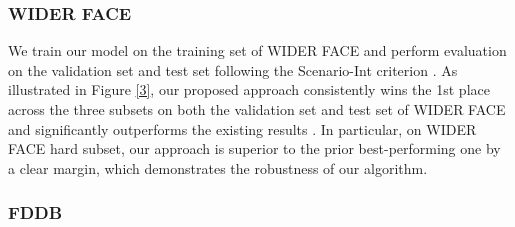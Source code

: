 \documentclass{article} \usepackage{nips13submit_e,times}
\begin{document}
\subsubsection{WIDER FACE}



We train our model on the training set of WIDER FACE and perform
evaluation on the validation set and test set following the Scenario-Int criterion \cite{wider}.
As illustrated in Figure \ref{3}, our proposed approach consistently wins the 1st place across the three subsets on both the validation set and test set of WIDER FACE and significantly outperforms the existing results \cite{ssh,sfd,HR,cmsrcnn,spl,vj2,faceness,wider}.
In particular, on WIDER FACE hard subset, our approach is superior to the prior best-performing one \cite{sfd} by a clear margin, which demonstrates the robustness of our algorithm.


\begin{figure*}
  \centering

  \caption{Precision-Recall curves on WIDER FACE's validation set and test set. All of these methods use the same Scenario-Int criterion \cite{wider}. Face R-FCN shows the superior performance over the prior methods across the three subsets (easy, medium and hard) in both validation and test sets. Best viewed in color.
}\label{3}

\end{figure*}

\subsubsection{FDDB}
\end{document}
